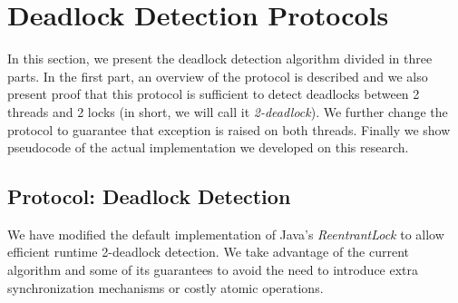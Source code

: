 \section{Deadlock Detection Protocols}

In this section, we present the deadlock detection algorithm divided in three parts. In the first part, an overview of the protocol is described and we also present proof that this protocol is sufficient to detect deadlocks between 2 threads and 2 locks (in short, we will call it \emph{2-deadlock}). We further change the protocol to guarantee that exception is raised on both threads. Finally we show pseudocode of the actual implementation we developed on this research.

\subsection{Protocol: Deadlock Detection}
We have modified the default implementation of Java's \emph{ReentrantLock} to allow efficient runtime 2-deadlock detection. We take advantage of the current algorithm and some of its guarantees to avoid the need to introduce extra synchronization mechanisms or costly atomic operations.

